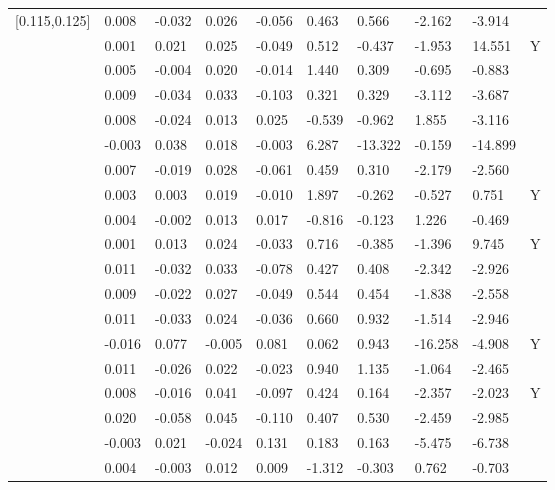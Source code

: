 \begin{table}[ht]
\begin{tabular}{llllllllll}
  [0.115,0.125] &  0.008 & -0.032 &  0.026 & -0.056 &   0.463 &   0.566 &  -2.162 &  -3.914 &  \\ 
  [0.125,0.135] &  0.001 &  0.021 &  0.025 & -0.049 &   0.512 &  -0.437 &  -1.953 &  14.551 & Y \\ 
  [0.135,0.145] &  0.005 & -0.004 &  0.020 & -0.014 &   1.440 &   0.309 &  -0.695 &  -0.883 &  \\ 
  [0.145,0.155] &  0.009 & -0.034 &  0.033 & -0.103 &   0.321 &   0.329 &  -3.112 &  -3.687 &  \\ 
  [0.155,0.165] &  0.008 & -0.024 &  0.013 &  0.025 &  -0.539 &  -0.962 &   1.855 &  -3.116 &  \\ 
  [0.165,0.175] & -0.003 &  0.038 &  0.018 & -0.003 &   6.287 & -13.322 &  -0.159 & -14.899 &  \\ 
  [0.175,0.185] &  0.007 & -0.019 &  0.028 & -0.061 &   0.459 &   0.310 &  -2.179 &  -2.560 &  \\ 
  [0.185,0.195] &  0.003 &  0.003 &  0.019 & -0.010 &   1.897 &  -0.262 &  -0.527 &   0.751 & Y \\ 
  [0.195,0.205] &  0.004 & -0.002 &  0.013 &  0.017 &  -0.816 &  -0.123 &   1.226 &  -0.469 &  \\ 
  [0.205,0.215] &  0.001 &  0.013 &  0.024 & -0.033 &   0.716 &  -0.385 &  -1.396 &   9.745 & Y \\ 
  [0.215,0.225] &  0.011 & -0.032 &  0.033 & -0.078 &   0.427 &   0.408 &  -2.342 &  -2.926 &  \\ 
  [0.225,0.235] &  0.009 & -0.022 &  0.027 & -0.049 &   0.544 &   0.454 &  -1.838 &  -2.558 &  \\ 
  [0.235,0.245] &  0.011 & -0.033 &  0.024 & -0.036 &   0.660 &   0.932 &  -1.514 &  -2.946 &  \\ 
  [0.245,0.255] & -0.016 &  0.077 & -0.005 &  0.081 &   0.062 &   0.943 & -16.258 &  -4.908 & Y \\ 
  [0.255,0.265] &  0.011 & -0.026 &  0.022 & -0.023 &   0.940 &   1.135 &  -1.064 &  -2.465 &  \\ 
  [0.265,0.275] &  0.008 & -0.016 &  0.041 & -0.097 &   0.424 &   0.164 &  -2.357 &  -2.023 & Y \\ 
  [0.275,0.285] &  0.020 & -0.058 &  0.045 & -0.110 &   0.407 &   0.530 &  -2.459 &  -2.985 &  \\ 
  [0.285,0.295] & -0.003 &  0.021 & -0.024 &  0.131 &   0.183 &   0.163 &  -5.475 &  -6.738 &  \\ 
  [0.295,0.305] &  0.004 & -0.003 &  0.012 &  0.009 &  -1.312 &  -0.303 &   0.762 &  -0.703 &  \\ 

\end{tabular}
\end{table}
